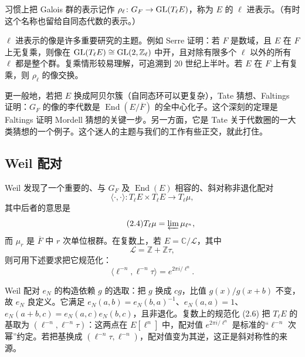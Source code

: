 习惯上把 Galois 群的表示记作 $\rho_\ell\colon G_F\to\mathrm{GL}(T_\ell E)$，称为 $E$ 的 $\ell$ 进表示。（有时这个名称也留给自同态代数的表示。）

$\ell$ 进表示的像是许多重要研究的主题。例如 Serre 证明：若 $F$ 是数域，且 $E$ 在 $F$ 上无复乘，则像在 $\mathrm{GL}(T_\ell E)\cong\mathrm{GL}(2,\mathbb{Z}_\ell)$ 中开，且对除有限多个 $\ell$ 以外的所有 $\ell$ 都是整个群。复乘情形较易理解，可追溯到 20 世纪上半叶。若 $E$ 在 $F$ 上有复乘，则 $\rho_\ell$ 的像交换。

更一般地，若把 $E$ 换成阿贝尔簇（自同态环可以更复杂），Tate 猜想、Faltings 证明：$G_F$ 的像的李代数是 $\operatorname{End}(E/\overline{F})$ 的全中心化子。这个深刻的定理是 Faltings 证明 Mordell 猜想的关键一步。另一方面，它是 Tate 关于代数圈的一大类猜想的一个例子。这个迷人的主题与我们的工作有些正交，就此打住。

\subsection{Weil 配对}\label{c5:sec:2.2}

Weil 发现了一个重要的、与 $G_F$ 及 $\operatorname{End}(E)$ 相容的、斜对称非退化配对
\begin{equation}\tag{2.3}\label{c5:eq:2.3}
\langle\cdot,\cdot\rangle\colon T_\ell E\times T_\ell E\longrightarrow T_\ell\mu,
\end{equation}
其中后者的意思是
\begin{equation}\tag{2.4}\label{c5:eq:2.4}
T_\ell\mu=\varprojlim\mu_{\ell^n},
\end{equation}
而 $\mu_r$ 是 $\overline{F}$ 中 $r$ 次单位根群。在复数上，若 $E=\mathbb{C}/\mathcal{L}$，其中
\begin{equation}\tag{2.5}\label{c5:eq:2.5}
\mathcal{L}=\mathbb{Z}+\mathbb{Z}\tau,
\end{equation}
则可用下述要求把它规范化：
\begin{equation}\tag{2.6}\label{c5:eq:2.6}
\langle \ell^{-n},\ell^{-n}\tau\rangle=e^{2\pi i/\ell^n}.
\end{equation}

\begin{annote}
Weil 配对 $e_N$ 的构造依赖 $g$ 的选取：把 $g$ 换成 $cg$，比值 $g(x)/g(x+b)$ 不变，故 $e_N$ 良定义。它满足 $e_N(a,b)=e_N(b,a)^{-1}$、$e_N(a,a)=1$、$e_N(a+b,c)=e_N(a,c)e_N(b,c)$，且非退化。复数上的规范化 (2.6) 把 $T_\ell E$ 的基取为 $(\ell^{-n},\ell^{-n}\tau)$：这两点在 $E[\ell^n]$ 中，配对值 $e^{2\pi i/\ell^n}$ 是标准的“$\ell^{-n}$ 次幂”约定。若把基换成 $(\ell^{-n}\tau,\ell^{-n})$，配对值变为其逆，这正是斜对称性的来源。
\par\vspace{0.15em}{\raggedleft 【来源：Silverman《The Arithmetic of Elliptic Curves》第 III 章（A）；Milne《Elliptic Curves》第 5 章（A）】\par}
\end{annote}

